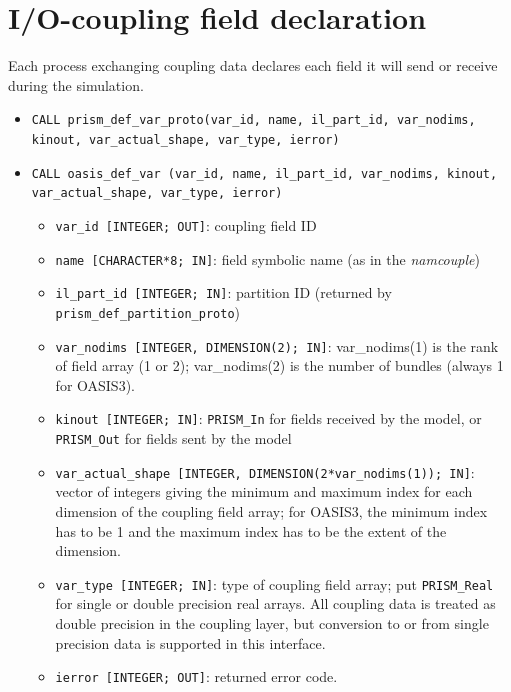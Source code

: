 
\section{I/O-coupling field declaration}
 \label{subsubsec_Declaration}

Each process exchanging coupling data declares each field it will send
or receive during the simulation. 

\begin{itemize}

\item {\tt CALL prism\_def\_var\_proto(var\_id, name, il\_part\_id,
  var\_nodims, kinout, var\_actual\_shape, var\_type, ierror)}
\item {\tt CALL oasis\_def\_var       (var\_id, name, il\_part\_id,
  var\_nodims, kinout, var\_actual\_shape, var\_type, ierror)}

\begin{itemize}
 \item {\tt var\_id [INTEGER; OUT]}: coupling field ID
 \item {\tt name [CHARACTER*8; IN]}: field symbolic name (as in the
   {\it namcouple})
 \item {\tt il\_part\_id [INTEGER; IN]}: partition ID (returned by
   {\tt prism\_def\_partition\-\_proto})
 \item {\tt var\_nodims [INTEGER, DIMENSION(2); IN]}: var\_nodims(1) is
   the rank of field array (1 or 2); var\_nodims(2) is the number of
   bundles (always 1 for OASIS3). 
 \item {\tt kinout [INTEGER; IN]}: {\tt PRISM\_In} for fields received by
   the model, or {\tt PRISM\_Out} for fields sent by the model 
 \item {\tt var\_actual\_shape [INTEGER, DIMENSION(2*var\_nodims(1)); IN]}: 
   vector of integers giving the minimum and maximum index for each
   dimension of the coupling field array; for OASIS3, the minimum
   index has to be 1 and the maximum index has to be the extent of the
   dimension.
 \item {\tt var\_type [INTEGER; IN]}: type of coupling field array;
   put {\tt PRISM\_Real} for single or double precision real
   arrays.  All coupling data is treated as double precision in the
   coupling layer, but conversion to or from single precision data
   is supported in this interface.
 \item {\tt ierror [INTEGER; OUT]}: returned error code. 
\end{itemize}
\end{itemize}


